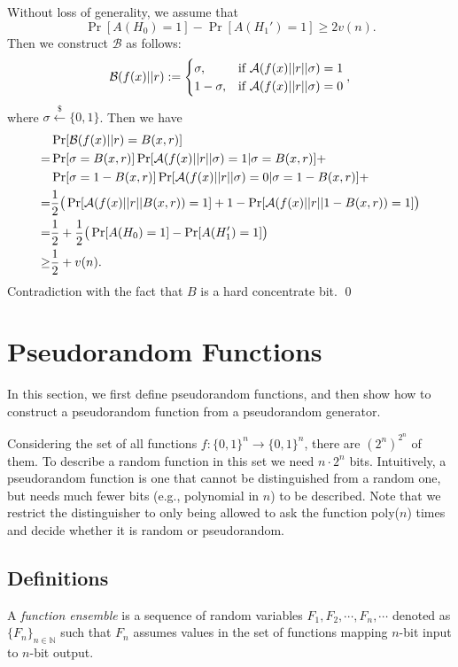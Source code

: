 \documentclass[12pt]{tufte-book}
\begin{document}
Without loss of generality, we assume that
\[
\Pr[A(H_0) = 1] - \Pr[A(H_1') = 1]
\geq 2v(n).
\]
Then we construct $\mathcal{B}$ as follows:
\[
\mathcal{B}(f(x)|| r) :=
\begin{cases}
\sigma, & \text{if } \mathcal{A}(f(x)|| r||\sigma) = 1\\
1 - \sigma, & \text{if } \mathcal{A}(f(x)||r|| \sigma) = 0
\end{cases},
\]
where $\sigma \xleftarrow{\$} \{0, 1\}$.
Then we have
\begin{align*}
& \Pr[\mathcal{B}(f(x)|| r) = B(x, r)]\\
=& \Pr[\sigma = B(x, r)] \Pr[ \mathcal{A}(f(x)|| r||\sigma)=1 | \sigma = B(x, r)] + \\
& \Pr[\sigma = 1 - B(x, r)] \Pr[ \mathcal{A}(f(x)|| r||\sigma) = 0 | \sigma = 1- B(x, r)] + \\
=& \frac{1}{2} \big( \Pr[\mathcal{A}(f(x)||r||B(x, r)) = 1] + 1 - \Pr[\mathcal{A}(f(x)|| r|| 1- B(x, r)) = 1] \big)\\
=& \frac{1}{2} + \frac{1}{2} \big( \Pr[A(H_0) = 1] - \Pr[A(H_1') = 1] \big)\\
\geq & \frac{1}{2} + v(n).
\end{align*}
Contradiction with the fact that $B$ is a hard concentrate bit.
\qed

 \section{Pseudorandom Functions}
In this section, we first define pseudorandom functions, and then show how to  construct a pseudorandom function from a pseudorandom generator.

Considering the set of all functions $f: \{0, 1\}^n \rightarrow \{0, 1\}^n$, there are $(2^n)^{2^n}$ of them.
To describe a random function in this set we need $n \cdot 2^n$ bits.
Intuitively, a pseudorandom function is one that cannot be distinguished from a random one,
but needs much fewer bits (e.g., polynomial in $n$) to be described.
Note that we restrict the distinguisher to only being allowed to ask the function poly($n$) times and decide whether it is random or pseudorandom.

\subsection{Definitions}

\begin{definition}
A \emph{function ensemble} is a sequence of random variables $F_1, F_2, \cdots, F_n, \cdots$ denoted as $\{F_n\}_{n \in \mathbb{N}}$ such that
$F_n$ assumes values in the set of functions mapping $n$-bit input to $n$-bit output.
\end{definition}
\end{document}
